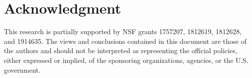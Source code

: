 \documentclass{article}
\begin{document}
\section*{Acknowledgment}

This research is partially supported by NSF grants 1757207, 1812619, 1812628, and 1914635. The views and conclusions contained in this document are those of the authors and should not be interpreted as representing the official policies, either expressed or implied, of the sponsoring organizations, agencies, or the U.S. government.


 
 

%


\end{document}
